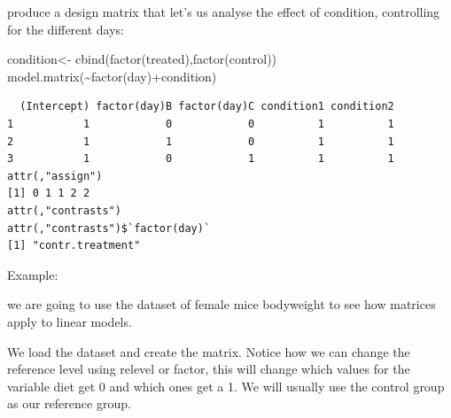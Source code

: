 \documentclass[
  letterpaper,
  DIV=11,
  numbers=noendperiod]{scrartcl}
\newenvironment{Shaded}{\begin{snugshade}}{\end{snugshade}}
\newcommand{\AttributeTok}[1]{\textcolor[rgb]{0.40,0.45,0.13}{#1}}
\newcommand{\ConstantTok}[1]{\textcolor[rgb]{0.56,0.35,0.01}{#1}}
\newcommand{\FunctionTok}[1]{\textcolor[rgb]{0.28,0.35,0.67}{#1}}
\newcommand{\NormalTok}[1]{\textcolor[rgb]{0.00,0.23,0.31}{#1}}
\newcommand{\OtherTok}[1]{\textcolor[rgb]{0.00,0.23,0.31}{#1}}
\newcommand{\SpecialCharTok}[1]{\textcolor[rgb]{0.37,0.37,0.37}{#1}}
\newcommand{\StringTok}[1]{\textcolor[rgb]{0.13,0.47,0.30}{#1}}
\begin{document}
produce a design matrix that let's us analyse the effect of condition,
controlling for the different days:

\begin{Shaded}
\begin{Highlighting}[]
\NormalTok{condition}\OtherTok{\textless{}{-}} \FunctionTok{cbind}\NormalTok{(}\FunctionTok{factor}\NormalTok{(treated),}\FunctionTok{factor}\NormalTok{(control))}
\FunctionTok{model.matrix}\NormalTok{(}\SpecialCharTok{\textasciitilde{}}\FunctionTok{factor}\NormalTok{(day)}\SpecialCharTok{+}\NormalTok{condition)}
\end{Highlighting}
\end{Shaded}

\begin{verbatim}
  (Intercept) factor(day)B factor(day)C condition1 condition2
1           1            0            0          1          1
2           1            1            0          1          1
3           1            0            1          1          1
attr(,"assign")
[1] 0 1 1 2 2
attr(,"contrasts")
attr(,"contrasts")$`factor(day)`
[1] "contr.treatment"
\end{verbatim}

Example:

we are going to use the dataset of female mice bodyweight to see how
matrices apply to linear models.

We load the dataset and create the matrix. Notice how we can change the
reference level using relevel or factor, this will change which values
for the variable diet get 0 and which ones get a 1. We will usually use
the control group as our reference group.

\begin{Shaded}
\end{Shaded}
\end{document}
